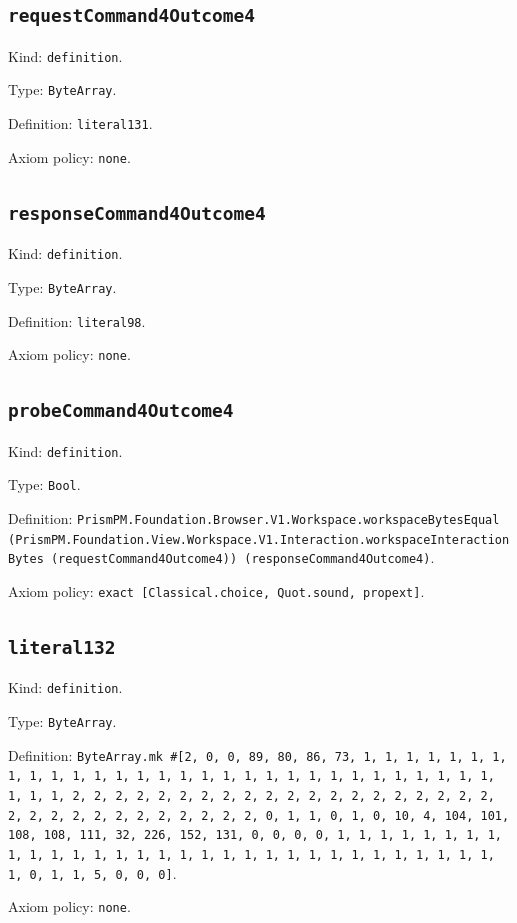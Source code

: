 \documentclass[11pt]{article}
\begin{document}
\subsection*{\texttt{requestCommand4Outcome4}}
\noindent Kind: \texttt{definition}.\par
\noindent Type: \texttt{ByteArray}.\par
\noindent Definition: \texttt{literal131}.\par
\noindent Axiom policy: \texttt{none}.\par
\subsection*{\texttt{responseCommand4Outcome4}}
\noindent Kind: \texttt{definition}.\par
\noindent Type: \texttt{ByteArray}.\par
\noindent Definition: \texttt{literal98}.\par
\noindent Axiom policy: \texttt{none}.\par
\subsection*{\texttt{probeCommand4Outcome4}}
\noindent Kind: \texttt{definition}.\par
\noindent Type: \texttt{Bool}.\par
\noindent Definition: \texttt{PrismPM.Foundation.Browser.V1.Workspace.workspaceBytesEqual (PrismPM.Foundation.View.Workspace.V1.Interaction.workspaceInteractionBytes (requestCommand4Outcome4)) (responseCommand4Outcome4)}.\par
\noindent Axiom policy: \texttt{exact [Classical.choice, Quot.sound, propext]}.\par
\subsection*{\texttt{literal132}}
\noindent Kind: \texttt{definition}.\par
\noindent Type: \texttt{ByteArray}.\par
\noindent Definition: \texttt{ByteArray.mk \#[2, 0, 0, 89, 80, 86, 73, 1, 1, 1, 1, 1, 1, 1, 1, 1, 1, 1, 1, 1, 1, 1, 1, 1, 1, 1, 1, 1, 1, 1, 1, 1, 1, 1, 1, 1, 1, 1, 1, 1, 2, 2, 2, 2, 2, 2, 2, 2, 2, 2, 2, 2, 2, 2, 2, 2, 2, 2, 2, 2, 2, 2, 2, 2, 2, 2, 2, 2, 2, 2, 2, 2, 0, 1, 1, 0, 1, 0, 10, 4, 104, 101, 108, 108, 111, 32, 226, 152, 131, 0, 0, 0, 0, 1, 1, 1, 1, 1, 1, 1, 1, 1, 1, 1, 1, 1, 1, 1, 1, 1, 1, 1, 1, 1, 1, 1, 1, 1, 1, 1, 1, 1, 1, 1, 1, 0, 1, 1, 5, 0, 0, 0]}.\par
\noindent Axiom policy: \texttt{none}.\par
\end{document}

